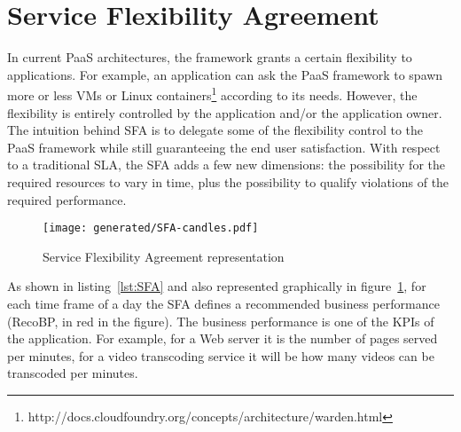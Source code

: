 \section{Service Flexibility Agreement}
\label{sec:sfa}

In current PaaS architectures, the framework grants a certain flexibility to applications.
For example, an application can ask the PaaS framework to spawn more or less VMs or Linux containers\footnote{http://docs.cloudfoundry.org/concepts/architecture/warden.html} according to its needs.
However, the flexibility is entirely controlled by the application and/or the application owner.
The intuition behind SFA is to delegate some of the flexibility control to the PaaS framework while still guaranteeing the end user satisfaction.
With respect to a traditional SLA, the SFA adds a few new dimensions: the possibility for the required resources to vary in time, plus the possibility to qualify violations of the required performance.

\begin{figure}[t]
\centering
\texttt{[image: generated/SFA-candles.pdf]}
\caption{Service Flexibility Agreement representation}
\label{fig:SFA}
\end{figure}


As shown in listing~\ref{lst:SFA} and also represented graphically in figure~\ref{fig:SFA}, for each time frame of a day the SFA defines a recommended business performance (RecoBP, in red in the figure). 
The business performance is one of the KPIs of the application.
For example, for a Web server it is the number of pages served per minutes, for a video transcoding service it will be how many videos can be transcoded per minutes.

